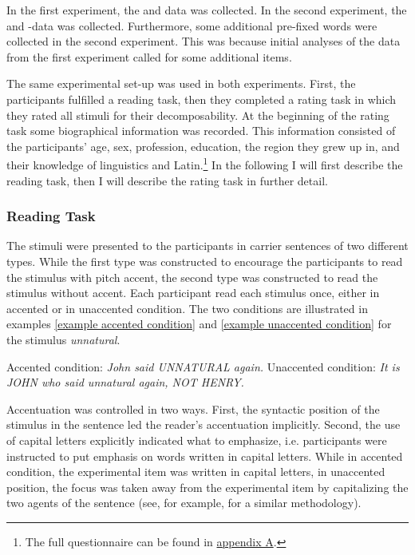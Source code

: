 In the first experiment, the  and data was collected.
In the second experiment, the  and -data was collected. Furthermore, some additional pre-fixed words were collected in the second experiment. 
This was because initial analyses of the data from the first experiment called for some additional items.
 
 The same experimental set-up was used in both experiments. First, the participants fulfilled a reading task, then they completed a rating task in which they rated all stimuli for their decomposability. 
 At the beginning of the rating task some biographical information was recorded. This information consisted of the participants' age, sex, profession, education, the region they grew up in, and their knowledge of linguistics and Latin.\footnote{The full questionnaire can be found in \hyperref[Appendix A: Decomposability Rating]{appendix A}.}  In the following I will first describe the reading task, then I will describe the rating task in further detail. 

\subsubsection{Reading Task}


The stimuli were presented to the participants in carrier sentences of two different types. 
While the first type was constructed to encourage the participants to read the stimulus with pitch accent, the second type was constructed to read the stimulus without accent. Each participant read each stimulus once, either in accented or in unaccented condition. 
The two conditions are illustrated in examples \ref{example accented condition}  and \ref{example unaccented condition} for the stimulus \textit{unnatural}.  


\begin{exe} 
	\ex \label{example accented condition} Accented condition:  \hspace*{.5cm}\textit{John said UNNATURAL again.}
	\ex \label{example unaccented condition} Unaccented condition: \hspace*{0cm} \textit{It is JOHN who said unnatural again, NOT HENRY.}
\end{exe}

Accentuation was controlled in two ways. First, the syntactic position of the stimulus in the sentence led the reader's accentuation implicitly. Second, the use of capital letters explicitly indicated what to emphasize,  i.e. participants were instructed to put emphasis on words written in capital letters. While in accented condition, the experimental item was written in capital letters, in unaccented position, the focus was taken away from the experimental item by capitalizing  the two agents of the sentence (see, for example, \cite{Plag.2011} for a similar methodology).


